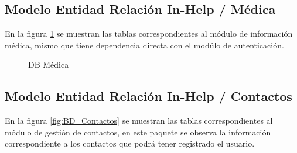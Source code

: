 \subsection{Modelo Entidad Relación In-Help / Médica}
En la figura \ref{fig:BD_Medica} se muestran las tablas correspondientes al módulo de información médica, mismo que tiene dependencia directa con el modúlo de autenticación.
\begin{figure}[htbp!]
	\centering
	\caption{DB Médica}
	\label{fig:BD_Medica}
\end{figure}

\subsection{Modelo Entidad Relación In-Help / Contactos}

En la figura \ref{fig:BD_Contactos} se muestran las tablas correspondientes al módulo de gestión de contactos, en este paquete se observa la información correspondiente a los contactos que podrá tener registrado el usuario.

